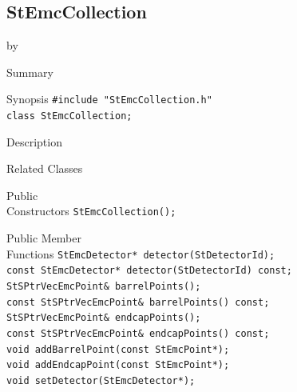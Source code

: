 \documentclass[twoside]{article}
\newcommand{\entrylabel}[1]{\mbox{\textbf{{#1}}}\hfil}%
\newenvironment{entry}
{\begin{list}{}%
    {\renewcommand{\makelabel}{\entrylabel}%
     \setlength{\labelwidth}{90pt}%
     \setlength{\leftmargin}{\labelwidth}
     \advance\leftmargin by \labelsep%
      }%
    }%
  {\end{list}}
\newcommand{\Entrylabel}[1]%
{\raisebox{0pt}[1ex][0pt]{\makebox[\labelwidth][l]%
    {\parbox[t]{\labelwidth}{\hspace{0pt}\textbf{{#1}}}}}}
\newenvironment{Entry}%
{\renewcommand{\entrylabel}{\Entrylabel}\begin{entry}}%
  {\end{entry}}
\begin{document}
\subsection{StEmcCollection}
\label{sec:StEmcCollection}
\begin{Entry}
\item[Summary]
\item[Synopsis]
    \verb+#include "StEmcCollection.h"+\\
    \verb+class StEmcCollection;+\\
\item[Description]
\item[Related Classes]
\item[Public\\ Constructors]
    \verb+StEmcCollection();+\\
\item[Public Member\\ Functions]
    \verb+StEmcDetector* detector(StDetectorId);+\\
    \verb+const StEmcDetector* detector(StDetectorId) const;+\\
    \verb+StSPtrVecEmcPoint& barrelPoints();+\\
    \verb+const StSPtrVecEmcPoint& barrelPoints() const;+\\
    \verb+StSPtrVecEmcPoint& endcapPoints();+\\
    \verb+const StSPtrVecEmcPoint& endcapPoints() const;+\\
    \verb+void addBarrelPoint(const StEmcPoint*);+\\
    \verb+void addEndcapPoint(const StEmcPoint*);+\\
    \verb+void setDetector(StEmcDetector*);+\\
\end{Entry}
\clearpage
\end{document}
